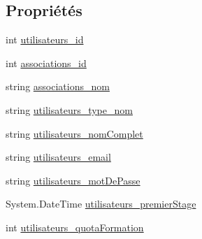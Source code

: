 \subsection*{Propriétés}
\begin{DoxyCompactItemize}
\item 
int \hyperlink{classforma_1_1formadb_data_set_1_1view__utilisateurs__associations_row_ac50f0f19cfa0b05839fb6171ebcce6a6}{utilisateurs\+\_\+id}
\item 
int \hyperlink{classforma_1_1formadb_data_set_1_1view__utilisateurs__associations_row_a043604026b9b422083096330d0bf1235}{associations\+\_\+id}
\item 
string \hyperlink{classforma_1_1formadb_data_set_1_1view__utilisateurs__associations_row_a9e5db047da8fd0449ad7f818410172ac}{associations\+\_\+nom}
\item 
string \hyperlink{classforma_1_1formadb_data_set_1_1view__utilisateurs__associations_row_a0ab08c2fbdd4a4469359bddea8affcf1}{utilisateurs\+\_\+type\+\_\+nom}
\item 
string \hyperlink{classforma_1_1formadb_data_set_1_1view__utilisateurs__associations_row_a2662f34fe3ee31669da95e7a141ee17f}{utilisateurs\+\_\+nom\+Complet}
\item 
string \hyperlink{classforma_1_1formadb_data_set_1_1view__utilisateurs__associations_row_a6f5b14aa6c51a7f322a5e091c347e93c}{utilisateurs\+\_\+email}
\item 
string \hyperlink{classforma_1_1formadb_data_set_1_1view__utilisateurs__associations_row_a309ec2323701e175cde104ace471badb}{utilisateurs\+\_\+mot\+De\+Passe}
\item 
System.\+Date\+Time \hyperlink{classforma_1_1formadb_data_set_1_1view__utilisateurs__associations_row_a5ee4911111c9a7af5d66c84bb1250dd7}{utilisateurs\+\_\+premier\+Stage}
\item 
int \hyperlink{classforma_1_1formadb_data_set_1_1view__utilisateurs__associations_row_a4e1321079952569dbc12ffa6c8964ae9}{utilisateurs\+\_\+quota\+Formation}
\end{DoxyCompactItemize}



